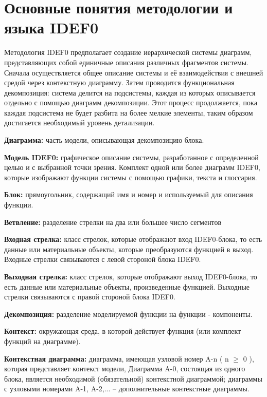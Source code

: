 \documentclass[a4paper, final]{article}
\begin{document}
\section{Основные понятия методологии и языка IDEF0}
\par Методология IDEF0 предполагает создание иерархической системы диаграмм, представляющих собой единичные описания различных фрагментов системы. Сначала осуществляется общее описание системы и её взаимодействия с внешней средой через контекстную диаграмму. Затем проводится функциональная декомпозиция: система делится на подсистемы, каждая из которых описывается отдельно с помощью диаграмм декомпозиции. Этот процесс продолжается, пока каждая подсистема не будет разбита на более мелкие элементы, таким образом достигается необходимый уровень детализации.
\par \textbf{Диаграмма: }часть модели, описывающая декомпозицию блока.
\par \textbf{Модель IDEF0:} графическое описание системы, разработанное с определенной целью и с выбранной точки зрения. Комплект одной или более диаграмм IDEF0, которые изображают функции системы с помощью графики, текста и глоссария.

\par \textbf{Блок:} прямоугольник, содержащий имя и номер и используемый для описания функции.
\par \textbf{Ветвление:} разделение стрелки на два или большее число сегментов
\par \textbf{Входная стрелка:} класс стрелок, которые отображают вход IDEF0-блока, то есть данные или материальные объекты, которые преобразуются функцией в выход. Входные стрелки связываются с левой стороной блока IDEF0.
\par \textbf{Выходная стрелка: }класс стрелок, которые отображают выход IDEF0-блока, то есть данные или материальные объекты, произведенные функцией. Выходные стрелки связываются с правой стороной блока IDEF0.
\par \textbf{Декомпозиция:} разделение моделируемой функции на функции - компоненты.

\par \textbf{Контекст: }окружающая среда, в которой действует функция (или комплект функций на диаграмме).
\par \textbf{Контекстная диаграмма:} диаграмма, имеющая узловой номер A-n ( n $\geq$ 0 ), которая представляет контекст модели, Диаграмма A-0, состоящая из одного блока, является необходимой (обязательной) контекстной диаграммой; диаграммы с узловыми номерами A-1, A-2,... -- дополнительные контекстные диаграммы.
\end{document}
